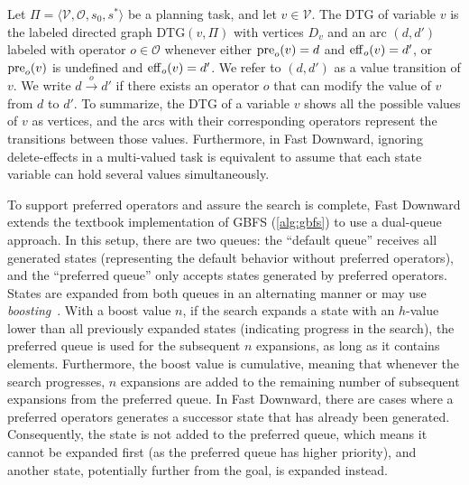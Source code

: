 \documentclass[ppgc,diss,english]{iiufrgs}
\begin{document}
Let $\Pi = \langle \mathcal{V}, \mathcal{O}, s_0, s^* \rangle$ be a \sas planning task, and let $v \in \mathcal{V}$. The DTG of variable $v$ is the labeled directed graph $\text{DTG}(v, \Pi)$ with vertices $D_v$ and an arc $(d, d')$ labeled with operator $o \in \mathcal{O}$ whenever either $\operatorname{pre}_{o}(v) = d$ and $\operatorname{eff}_{o}(v) = d'$, or $\operatorname{pre}_{o}(v)$ is undefined and $\operatorname{eff}_{o}(v) = d'$. We refer to $(d, d')$ as a value transition of $v$. We write $d \xrightarrow{o} d'$ if there exists an operator $o$ that can modify the value of $v$ from $d$ to $d'$.
To summarize, the DTG of a variable $v$ shows all the possible values of $v$ as vertices, and the arcs with their corresponding operators represent the transitions between those values. Furthermore, in Fast Downward, ignoring delete-effects in a multi-valued task is equivalent to assume that each state variable can hold several values simultaneously.

To support preferred operators and assure the search is complete, Fast Downward extends the textbook implementation of GBFS (\cref{alg:gbfs}) to use a dual-queue approach. In this setup, there are two queues: the ``default queue'' receives all generated states (representing the default behavior without preferred operators), and the ``preferred queue'' only accepts states generated by preferred operators. States are expanded from both queues in an alternating manner or may use \emph{boosting}~\cite{Richter.Helmert/2009}. With a boost value $n$, if the search expands a state with an $h$-value lower than all previously expanded states (indicating progress in the search), the preferred queue is used for the subsequent $n$ expansions, as long as it contains elements. Furthermore, the boost value is cumulative, meaning that whenever the search progresses, $n$ expansions are added to the remaining number of subsequent expansions from the preferred queue. In Fast Downward, there are cases where a preferred operators generates a successor state that has already been generated. Consequently, the state is not added to the preferred queue, which means it cannot be expanded first (as the preferred queue has higher priority), and another state, potentially further from the goal, is expanded instead.
\end{document}
